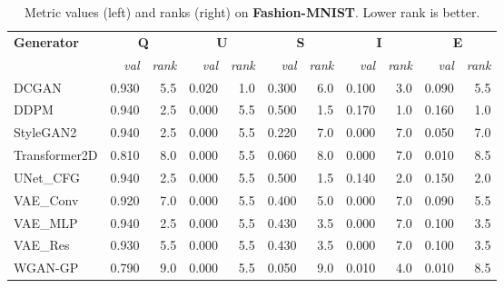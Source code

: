 \begin{table}[H]\centering\scriptsize
\caption{Metric values (left) and ranks (right) on \textbf{Fashion-MNIST}. Lower rank is better.}
\label{tab:vals-ranks-fashionmnist}
\begin{tabular}{l rr rr rr rr rr}
\toprule
\multirow{2}{*}{\textbf{Generator}} & \multicolumn{2}{c}{\textbf{Q}} & \multicolumn{2}{c}{\textbf{U}} & \multicolumn{2}{c}{\textbf{S}} & \multicolumn{2}{c}{\textbf{I}} & \multicolumn{2}{c}{\textbf{E}} \\
 & \textit{val} & \textit{rank} & \textit{val} & \textit{rank} & \textit{val} & \textit{rank} & \textit{val} & \textit{rank} & \textit{val} & \textit{rank} \\
\midrule
DCGAN & 0.930 & 5.5 & 0.020 & 1.0 & 0.300 & 6.0 & 0.100 & 3.0 & 0.090 & 5.5 \\
DDPM & 0.940 & 2.5 & 0.000 & 5.5 & 0.500 & 1.5 & 0.170 & 1.0 & 0.160 & 1.0 \\
StyleGAN2 & 0.940 & 2.5 & 0.000 & 5.5 & 0.220 & 7.0 & 0.000 & 7.0 & 0.050 & 7.0 \\
Transformer2D & 0.810 & 8.0 & 0.000 & 5.5 & 0.060 & 8.0 & 0.000 & 7.0 & 0.010 & 8.5 \\
UNet\_CFG & 0.940 & 2.5 & 0.000 & 5.5 & 0.500 & 1.5 & 0.140 & 2.0 & 0.150 & 2.0 \\
VAE\_Conv & 0.920 & 7.0 & 0.000 & 5.5 & 0.400 & 5.0 & 0.000 & 7.0 & 0.090 & 5.5 \\
VAE\_MLP & 0.940 & 2.5 & 0.000 & 5.5 & 0.430 & 3.5 & 0.000 & 7.0 & 0.100 & 3.5 \\
VAE\_Res & 0.930 & 5.5 & 0.000 & 5.5 & 0.430 & 3.5 & 0.000 & 7.0 & 0.100 & 3.5 \\
WGAN-GP & 0.790 & 9.0 & 0.000 & 5.5 & 0.050 & 9.0 & 0.010 & 4.0 & 0.010 & 8.5 \\
\bottomrule
\end{tabular}
\end{table}
